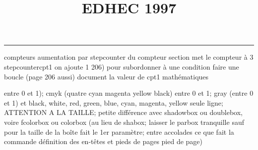 \documentclass[11pt]{article}%
\title{\bf \vspace{-2cm} EDHEC 1997} %
\author{} %
\date{} %
\renewcommand{\headrulewidth}{0pt}%
\renewcommand{\footrulewidth}{0.4pt}%
\begin{document}
\maketitle %
\vspace{-1.4cm}\hrule %
\thispagestyle{fancy}

\vspace*{.2cm}



compteurs%
aumentation par stepcounter du compteur section%
met le compteur à 3%
stepcounter{cpt1} on ajoute 1%
206) pour subordonner à une condition %
faire une boucle (page 206 aussi) %
document la valeur de cpt1 
mathématiques\newcommand{\ch}{\operatorname{ch}} 
\newcommand{\sh}{\operatorname{sh}}
\renewcommand{\tanh}{\operatorname{th}}
\renewcommand{\sinh}{\operatorname{sh}}
\renewcommand{\cosh}{\operatorname{ch}}
\newcommand{\argsh}{\operatorname{argsh}}
\newcommand{\argch}{\operatorname{argch}}
\newcommand{\argth}{\operatorname{argth}}
\newcommand{\ker}{\operatorname{Ker}}
\renewcommand{\im}{\operatorname{Im}}
\newcommand{\rg}{\operatorname{rg}}
\newcommand{\Id}{\operatorname{Id}}
\newcommand{\id}{\operatorname{id}}
\renewcommand{\leq}{\leq}
\renewcommand{\geq}{\geq }

entre 0 et 1); cmyk (quatre cyan magenta yellow black) entre 0 et 1;
gray (entre 0 et 1) et black, white, red, green, blue, cyan, magenta,
yellow%
seule ligne; ATTENTION A LA TAILLE; petite différence avec shadowbox ou
doublebox, voire fcolorbox ou colorbox (au lieu de shabox; laisser le
parbox tranquille sauf pour la taille de la boîte
\newcommand{\Tbox}[1]{\begin{center} \shabox{\parbox{0.6
\linewidth}{#1}} \end{center}} %
fait le 1er paramètre; entre accolades ce que fait la commande
définition des en-têtes et pieds de pages\pagestyle{fancy}
\chead{}
\rfoot[ \ \thepage]{\thepage}
\cfoot{}
\lfoot{}
\thispagestyle{fancy} %
pied de page)\renewcommand{\footrulewidth}{0.4pt}
\renewcommand{\headrulewidth}{0.4pt}
\end{document}
